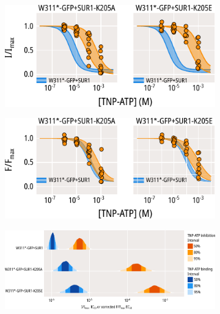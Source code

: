 \begin{figure}[h]
\begin{subfigure}[t]{0.45\textwidth}
	\end{subfigure}
	\vfill
	\begin{subfigure}[t]{0.45\textwidth}
		\caption{}\label{ch6fig:k205_3}
		\centering
		\includegraphics[width=\textwidth]{k205_3.pdf}
	\end{subfigure}
	\hfill
	\begin{subfigure}[t]{0.45\textwidth}
		\caption{}\label{ch6fig:k205_4}
		\centering
		\includegraphics[width=\textwidth]{k205_4.pdf}
	\end{subfigure}
	\vfill
	\begin{subfigure}[t]{0.9\textwidth}
		\caption{}\label{ch6fig:k205_5}
		\centering
		\includegraphics[width=\textwidth]{k205_5.pdf}
	\end{subfigure}
	\caption[Mutations at K205 alter nucleotide inhibition and binding]{
	}\label{ch6fig:k205_1}
\end{figure}

